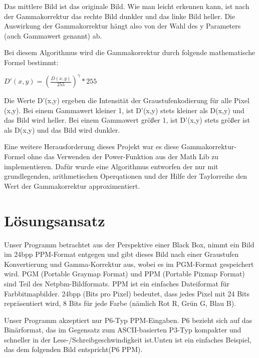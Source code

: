 \documentclass[course=erap]{aspdoc}
\begin{document}

\par
Das mittlere Bild ist das originale Bild. Wie man leicht erkennen kann, ist nach der Gammakorrektur das rechte Bild dunkler und das linke Bild heller. Die Auswirkung der Gammakorrektur hängt also von der Wahl des y Parameters (auch Gammawert genannt) ab.

\par
Bei diesem Algorithmus wird die Gammakorrektur durch folgende mathematische Formel bestimmt:

\begin{center}
${D'(x,y)={\left( \frac{D(x,y)}{255} \right)}^{\gamma}*255}$
\end{center}

\par
Die Werte D'(x,y) ergeben die Intensität der Graustufenkodierung für alle Pixel (x,y). Bei einem Gammawert kleiner 1, ist D'(x,y) stets kleiner als D(x,y) und das Bild wird heller. Bei einem Gammawert größer 1, ist D'(x,y) stets größer ist als D(x,y) und das Bild wird dunkler.

\par
Eine weitere Herausforderung dieses Projekt war es diese Gammakorrektur-Formel ohne das Verwenden der Power-Funktion aus der Math Lib zu implementieren. Dafür wurde eine Algorithmus entworfen der nur mit grundlegenden, arithmetischen Operqationen und der Hilfe der Taylorreihe den Wert der Gammakorrektur approximentiert. 



\section{Lösungsansatz}
\par
Unser Programm betrachtet aus der Perspektive einer Black Box, nimmt ein Bild im 24bpp PPM-Format entgegen und gibt dieses Bild nach einer Graustufen Konvertierung und Gamma-Korrektur aus, wobei es im PGM-Format gespeichert wird. PGM (Portable Graymap Format) und PPM (Portable Pixmap Format) sind Teil des Netpbm-Bildformats. PPM ist ein einfaches Dateiformat für Farbbitmapbilder. 24bpp (Bits pro Pixel) bedeutet, dass jedes Pixel mit 24 Bits repräsentiert wird, 8 Bits für jede Farbe (nämlich Rot R, Grün G, Blau B). 

\par
Unser Programm akzeptiert nur P6-Typ PPM-Eingaben. P6 bezieht sich auf das Binärformat, das im Gegensatz zum ASCII-basierten P3-Typ kompakter und schneller in der Lese-/Schreibgeschwindigkeit ist.Unten ist ein einfaches Beispiel, das dem folgenden Bild entspricht(P6 PPM).
\end{document}
